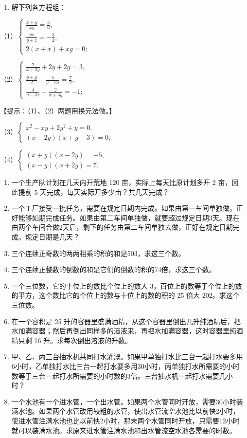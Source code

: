 \begin{enumerate}[start=35]
\item
  解下列各方程组：
\end{enumerate}

（1）\(\left\{ \begin{array}{l} \frac{x + y}{xy} = \frac{5}{6}, \\ \frac{ys}{y + z} = -\frac{3}{2}, \\ 2(x + x) + xg = 0; \end{array} \right.\)

（2）\(\left\{ \begin{array}{l} \frac{2}{x + 2y} + 2y + 2g = 3, \\ \frac{y + g}{2} - \frac{5}{g - 3a} = \frac{7}{2}, \\ \frac{4}{g - 3x} - \frac{2}{x + 3y} = -1; \end{array} \right.\)

【提示：（1）、（2）两题用换元法做。】

（3）\(\left\{ \begin{array}{l} x^{2} - xy + 2y^{2} + y = 0, \\ (x - 2y)(x + y - 3) = 0; \end{array} \right.\)

（4）\(\left\{ \begin{array}{l} (x + y)(x - 2y) = -5, \\ (x - y)(x + 2y) = 7. \end{array} \right.\)

\begin{enumerate}[start=36]
\item
  一个生产队计划在几天内开荒地 120 亩，实际上每天比原计划多开 2
  亩，因此提前 5 天完成，每天实际开多少亩？共几天完成？
\item
  一个工厂接受一批任务，需要在规定日期内完成。如果由第一车间单独做，正好能够如期完成任务。如果由第二车间单独做，就要超过规定日期3天。现在由两个车间合做2天后，剩下的任务由第二车间单独去做，正好在规定日期完成。规定日期是几天？
\item
  三个连续正奇数的两两相乘的积的和是503，求这三个数。
\item
  三个连续正整数的倒数的和是它们的倒数的积的74倍，求这三个数。
\item
  一个三位数，它的十位上的数比个位上的数大
  3，百位上的数等于个位上的数的平方，这个数比它的个位上的数与十位上的数的积的
  25 倍大 202。求这个三位数。
\item
  在一个容积是 25
  升的容器里盛满酒精，从这个容器里倒出几升纯酒精后，把水加满容器；然后再倒出同样多的溶液来，再把水加满容器，这时容器里纯酒精只剩
  16 升。求每次倒出溶液的升数。
\item
  甲、乙、丙三台抽水机共同打水灌溉。如果甲单独打水比三台一起打水要多用6小时，乙单独打水比三台一起打水要多用30小时，丙单独打水所需要的小时数等于三台一起打水所需要的小时数的3倍。三台抽水机一起打水需要几小时？
\item
  一个水池有一个进水管，一个出水管。如果两个水管同时开放，需要30小时装满水池。如果两个水管改用较粗的水管，使出水管流空水池比以前快2小时，使进水管注满水池也比以前快2小时，那末两个水管同时开放，只需要12小时就可以装满水池。求原来进水管注满水池和出水管流空水池各需要的时数。
\end{enumerate}

